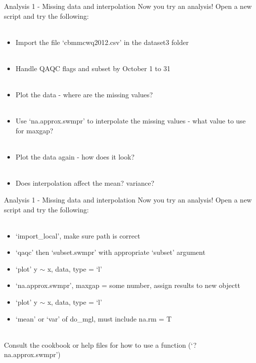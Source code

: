 \documentclass[xcolor=svgnames]{beamer}\usepackage[]{graphicx}\usepackage[]{color}
\begin{document}
\begin{frame}[containsverbatim]{Analysis 1 - Missing data and interpolation}
Now you try an analysis! Open a new script and try the following: \\~\\
\begin{itemize}
\item Import the file `cbmmcwq2012.csv' in the dataset3 folder \\~\\
\item Handle QAQC flags and subset by October 1 to 31 \\~\\
\item Plot the data - where are the missing values?\\~\\
\item Use `na.approx.swmpr' to interpolate the missing values - what value to use for maxgap?\\~\\
\item Plot the data again - how does it look? \\~\\
\item Does interpolation affect the mean? variance?
\end{itemize}
\end{frame}

\begin{frame}[containsverbatim]{Analysis 1 - Missing data and interpolation}
Now you try an analysis! Open a new script and try the following: \\~\\
\begin{itemize}
\item `import\_local', make sure path is correct
\item `qaqc' then `subset.swmpr' with appropriate `subset' argument
\item `plot' y $\sim$ x, data, type = `l'
\item `na.approx.swmpr', maxgap = some number, assign results to new objectt 
\item `plot' y $\sim$ x, data, type = `l'
\item `mean' or `var' of do_mgl, must include na.rm = T \\~\\
\end{itemize}
Consult the cookbook or help files for how to use a function (`?na.approx.swmpr')
\end{frame}
\end{document}
